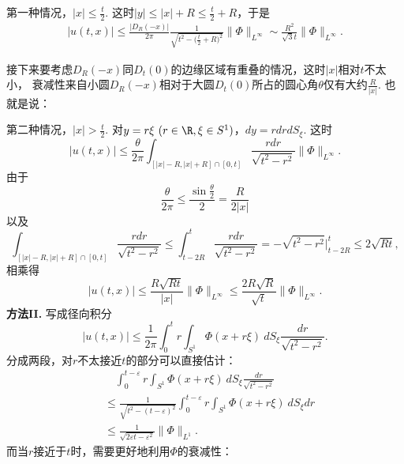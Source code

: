 \begin{itemize}
第一种情况，$|x|\leqslant\frac{t}{2}$. 这时$|y|\leqslant|x|+R\leqslant\frac{t}{2}+R$，于是
\begin{align*}
    |u(t,x)|\leqslant\frac{|D_R(-x)|}{2\pi}\frac{1}{\sqrt{t^2-\big(\frac{t}{2}+R\big)^2}}\|\varPhi\|_{L^\infty}
    \sim\frac{R^2}{\sqrt{3}t}\|\varPhi\|_{L^\infty}.
\end{align*}
接下来要考虑$D_R(-x)$同$D_t(0)$的边缘区域有重叠的情况，这时$|x|$相对$t$不太小，
衰减性来自小圆$D_R(-x)$相对于大圆$D_t(0)$所占的圆心角$\theta$仅有大约$\frac{R}{|x|}$. 也就是说：

第二种情况，$|x|>\frac{t}{2}$. 对$y=r\xi\ (r\in\R,\xi\in S^1)$，$dy=rdrdS_\xi$. 这时
\[
    |u(t,x)|\leqslant\frac{\theta}{2\pi}\int_{[|x|-R,|x|+R]\cap[0,t]}\frac{rdr}{\sqrt{t^2-r^2}}\|\varPhi\|_{L^\infty}.
\]
由于$$\frac{\theta}{2\pi}\leqslant\frac{\sin\frac{\theta}{2}}{2}=\frac{R}{2|x|}$$
以及$$\int_{[|x|-R,|x|+R]\cap[0,t]}\frac{rdr}{\sqrt{t^2-r^2}}\leqslant\int_{t-2R}^{t}\frac{rdr}{\sqrt{t^2-r^2}}
=-\sqrt{t^2-r^2}\Big|_{t-2R}^t\leqslant2\sqrt{Rt},$$
相乘得
$$|u(t,x)|\leqslant\frac{R\sqrt{Rt}}{|x|}\|\varPhi\|_{L^\infty}
\leqslant\frac{2R\sqrt{R}}{\sqrt{t}}\|\varPhi\|_{L^\infty}.$$
\textbf{方法II.} 写成径向积分
\[|u(t,x)|\leqslant\frac{1}{2\pi}\int_0^t r\int_{S^1}\varPhi(x+r\xi)\>dS_\xi\frac{dr}{\sqrt{t^2-r^2}}.\]
分成两段，对$r$不太接近$t$的部分可以直接估计：
\begin{align*}
    &\quad\int_0^{t-\varepsilon} r\int_{S^1}\varPhi(x+r\xi)\>dS_\xi\frac{dr}{\sqrt{t^2-r^2}}\\
    &\leqslant\frac{1}{\sqrt{t^2-(t-\varepsilon)^2}}\int_0^{t-\varepsilon} r\int_{S^1}\varPhi(x+r\xi)\>dS_\xi dr\\
    &\leqslant\frac{1}{\sqrt{2\varepsilon t-\varepsilon^2}}\|\varPhi\|_{L^1}.
\end{align*}
而当$r$接近于$t$时，需要更好地利用$\Phi$的衰减性：


\end{itemize}
